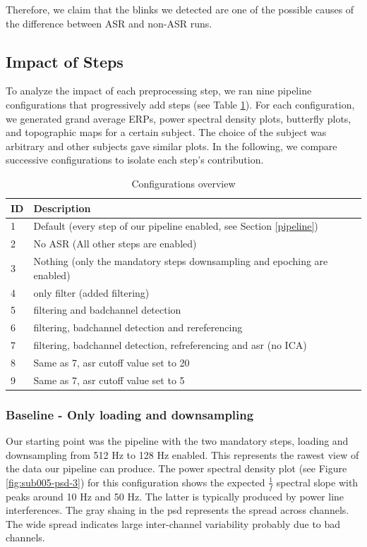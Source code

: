 \documentclass{scrartcl}
\begin{document}
Therefore, we claim that the blinks we detected are one of the possible causes of the difference between ASR and non-ASR runs.


\subsection{Impact of Steps}\label{impact-steps}
To analyze the impact of each preprocessing step, we ran nine pipeline configurations that progressively add steps (see Table \ref{tab:configs}). For each configuration, we generated grand average ERPs, power spectral density plots, butterfly plots, and topographic maps for a certain subject. The choice of the subject was arbitrary and other subjects gave similar plots. In the following, we compare successive configurations to isolate each step's contribution.

\begin{table}[h]
    \centering
    \begin{tabular}{l|l}
        ID & Description  \\\hline
        1 & Default (every step of our pipeline enabled, see Section \ref{pipeline}) \\\hline
        2 & No ASR (All other steps are enabled) \\\hline
        3 & Nothing (only the mandatory steps downsampling and epoching are enabled) \\\hline
        4 & only filter (added filtering) \\\hline
        5 & filtering and badchannel detection \\\hline
        6 & filtering, badchannel detection and rereferencing \\\hline
        7 & filtering, badchannel detection, refreferencing and asr (no ICA) \\\hline
        8 & Same as 7, asr cutoff value set to 20 \\\hline
        9 & Same as 7, asr cutoff value set to 5
    \end{tabular}
    \caption{Configurations overview}
    \label{tab:configs}
\end{table}

\subsubsection{Baseline - Only loading and downsampling}
Our starting point was the pipeline with the two mandatory steps, loading and downsampling from 512 Hz to 128 Hz enabled. This represents the rawest view of the data our pipeline can produce. The power spectral density plot (see Figure \ref{fig:sub005-psd-3}) for this configuration shows the expected $\frac{1}{f}$ spectral slope with peaks around 10 Hz and 50 Hz. The latter is typically produced by power line interferences. The gray shaing in the psd represents the spread across channels. The wide spread indicates large inter-channel variability probably due to bad channels.
\end{document}
